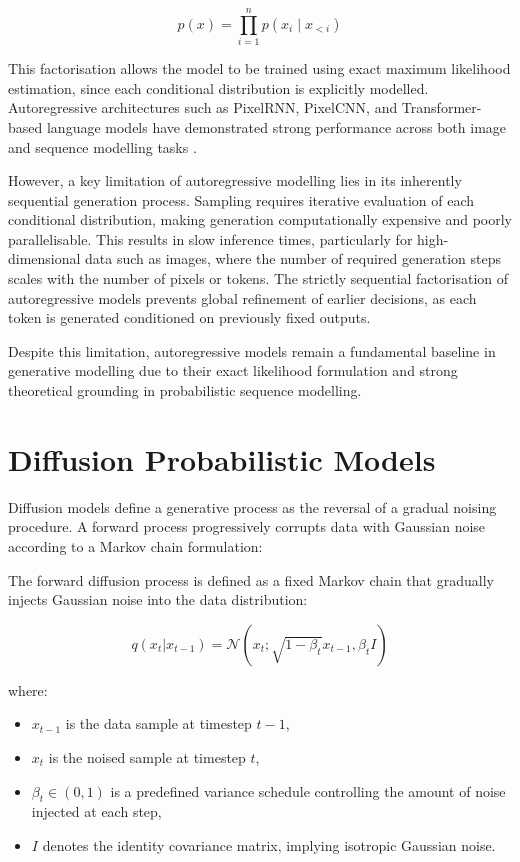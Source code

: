 \documentclass[a4paper,twoside,12pt]{report}
\begin{document}
\begin{equation}
p(x) = \prod_{i=1}^{n} p(x_i \mid x_{<i})
\end{equation}

This factorisation allows the model to be trained using exact maximum likelihood estimation, since each conditional distribution is explicitly modelled. Autoregressive architectures such as PixelRNN, PixelCNN, and Transformer-based language models have demonstrated strong performance across both image and sequence modelling tasks \citep{van2016pixelrnn, oord2016pixelcnn, vaswani2017attention}.

However, a key limitation of autoregressive modelling lies in its inherently sequential generation process. Sampling requires iterative evaluation of each conditional distribution, making generation computationally expensive and poorly parallelisable. This results in slow inference times, particularly for high-dimensional data such as images, where the number of required generation steps scales with the number of pixels or tokens. The strictly sequential factorisation of autoregressive models prevents global refinement of earlier decisions, as each token is generated conditioned on previously fixed outputs.

Despite this limitation, autoregressive models remain a fundamental baseline in generative modelling due to their exact likelihood formulation and strong theoretical grounding in probabilistic sequence modelling.


\section{Diffusion Probabilistic Models}

Diffusion models define a generative process as the reversal of a gradual noising procedure\citep{ho2020ddpm,song2021score}. A forward process progressively corrupts data with Gaussian noise according to a Markov chain formulation:

The forward diffusion process is defined as a fixed Markov chain that gradually injects Gaussian noise into the data distribution:

\begin{equation}
q(x_t|x_{t-1}) = \mathcal{N}(x_t; \sqrt{1 - \beta_t}x_{t-1}, \beta_t I)
\end{equation}

where:
\begin{itemize}
    \item \(x_{t-1}\) is the data sample at timestep \(t-1\),
    \item \(x_t\) is the noised sample at timestep \(t\),
    \item \(\beta_t \in (0,1)\) is a predefined variance schedule controlling the amount of noise injected at each step,
    \item \(I\) denotes the identity covariance matrix, implying isotropic Gaussian noise.
\end{itemize}
\end{document}
